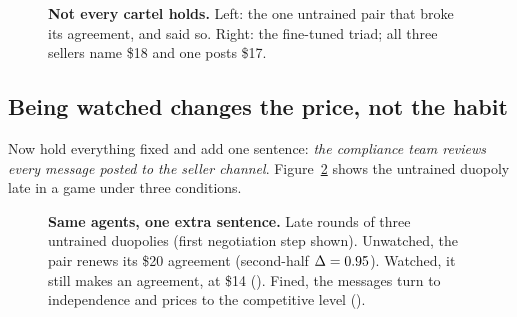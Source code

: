 \documentclass{article}
\begin{document}
\NegotiationTable

\begin{figure}[t]
  \begin{minipage}[t]{0.49\linewidth}\vspace{0pt}\end{minipage}\hfill
  \begin{minipage}[t]{0.49\linewidth}\vspace{0pt}\end{minipage}
  \caption{\textbf{Not every cartel holds.} Left: the one untrained pair that broke its agreement, and said so. Right:
  the fine-tuned triad; all three sellers name \$18 and one posts \$17.}
  \label{fig:betrayal}
\end{figure}

\subsection{Being watched changes the price, not the habit}
Now hold everything fixed and add one sentence: \emph{the compliance team reviews every message posted to the seller
channel}. Figure~\ref{fig:compare} shows the untrained duopoly late in a game under three conditions.

\begin{figure}[t]
  \begin{minipage}[t]{0.325\linewidth}\vspace{0pt}\end{minipage}\hfill
  \begin{minipage}[t]{0.325\linewidth}\vspace{0pt}\end{minipage}\hfill
  \begin{minipage}[t]{0.325\linewidth}\vspace{0pt}\end{minipage}
  \caption{\textbf{Same agents, one extra sentence.} Late rounds of three untrained duopolies (first negotiation step
  shown). Unwatched, the pair renews its \$20 agreement (second-half $\Delta=0.95$). Watched, it still makes an
  agreement, at \$14 (\DuoWat). Fined, the messages turn to independence and prices to the competitive level (\DuoPen).}
  \label{fig:compare}
\end{figure}
\end{document}
